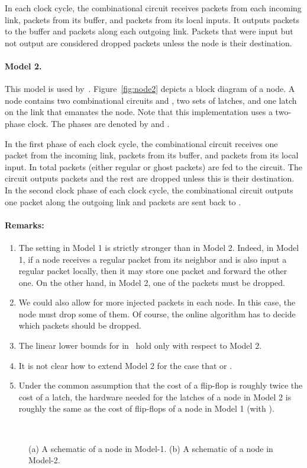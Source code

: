 \documentclass[11pt]{article}
\newenvironment{proof sketch}[1]{\noindent {\emph{Proof sketch of #1:}}}{\hfill \qed}
\begin{document}
In each clock cycle, the combinational circuit  receives 
packets from each incoming link,  packets from its buffer, and
 packets from its local inputs. It outputs  packets to the
buffer and  packets along each outgoing link. Packets that were
input but not output are considered dropped packets unless the node is
their destination.

\paragraph{Model 2.}
This model is used by~\cite{AKK,AZ}. Figure~\ref{fig:node2} depicts a
block diagram of a node. A node contains two combinational circuits
 and , two sets of  latches, and one latch
on the link that emanates the node. Note that this implementation uses a
two-phase clock. The phases are denoted by  and .

In the first phase of each clock cycle, the combinational circuit  receives
one packet from the incoming link,  packets from its buffer, and  packets from its
local input. In total  packets (either regular or ghost packets) are fed to the
 circuit. The  circuit outputs  packets and the rest are dropped
unless this is their destination.  In the
second clock phase of each clock cycle, the combinational circuit  outputs
one packet along the outgoing link and  packets are sent back to .

\paragraph{Remarks:}
\begin{enumerate}
\item The setting  in Model 1 is strictly stronger than  in Model 2.
  Indeed, in Model 1, if a node receives a regular packet from its neighbor and is
  also input a regular packet locally, then it may store one packet and forward the
  other one.  On the other hand, in Model 2, one of the packets must be dropped.

\item We could also allow for more injected packets in each node. In
  this case, the node must drop some of them. Of course, the online
  algorithm has to decide which packets should be dropped.
\item The linear lower bounds for  in~\cite{AZ,AKK} hold only with
  respect to Model 2.
\item It is not clear how to extend Model 2 for the case that  or .
\item Under the common assumption that the cost of a flip-flop is
  roughly twice the cost of a latch, the hardware needed for the
  latches of a node in Model 2 is roughly the same as the cost of
  flip-flops of a node in Model 1 (with ).
\end{enumerate}

\begin{figure}[h!]\centering
  \\
  \caption{(a) A schematic of a node in Model-1. (b) A schematic of a node in Model-2.}
\end{figure}
\end{document}
